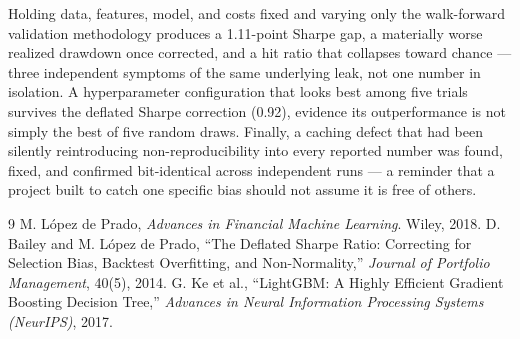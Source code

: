\documentclass[10pt]{article}
\begin{document}
Holding data, features, model, and costs fixed and varying only the walk-forward validation methodology produces a 1.11-point Sharpe gap, a materially worse realized drawdown once corrected, and a hit ratio that collapses toward chance --- three independent symptoms of the same underlying leak, not one number in isolation. A hyperparameter configuration that looks best among five trials survives the deflated Sharpe correction (0.92), evidence its outperformance is not simply the best of five random draws. Finally, a caching defect that had been silently reintroducing non-reproducibility into every reported number was found, fixed, and confirmed bit-identical across independent runs --- a reminder that a project built to catch one specific bias should not assume it is free of others.

\begin{thebibliography}{9}
 M. L\'opez de Prado, \emph{Advances in Financial Machine Learning}. Wiley, 2018.
 D. Bailey and M. L\'opez de Prado, ``The Deflated Sharpe Ratio: Correcting for Selection Bias, Backtest Overfitting, and Non-Normality,'' \emph{Journal of Portfolio Management}, 40(5), 2014.
 G. Ke et al., ``LightGBM: A Highly Efficient Gradient Boosting Decision Tree,'' \emph{Advances in Neural Information Processing Systems (NeurIPS)}, 2017.
\end{thebibliography}
\end{document}
